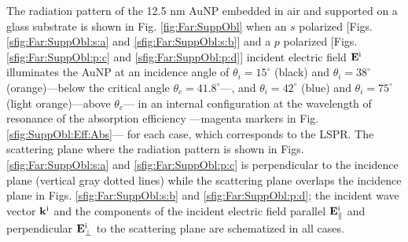 The radiation pattern of the 12.5 nm AuNP embedded in air and supported on a glass substrate is shown in Fig. \ref{fig:Far:SuppObl} when an $s$ polarized [Figs. \ref{sfig:Far:SuppObl:s:a} and \ref{sfig:Far:SuppObl:s:b}] and a  $p$ polarized [Figs. \ref{sfig:Far:SuppObl:p:c} and \ref{sfig:Far:SuppObl:p:d}] incident electric field $\vb{E}^\text{i}$ illuminates the AuNP at an incidence angle of $\theta_i = 15^\circ$ (black) and $\theta_i = 38^\circ$ (orange)---below the critical angle $\theta_c = 41.8^\circ$---, and $\theta_i = 42^\circ$ (blue) and $\theta_i = 75^\circ$ (light orange)---above  $\theta_c$--- in an internal configuration at the wavelength of resonance of the absorption efficiency ---magenta markers in Fig. \ref{sfig:SuppObl:Eff:Abs}--- for each case, which corresponds to the LSPR. The scattering plane where the radiation pattern is shown in Figs. \ref{sfig:Far:SuppObl:s:a} and \ref{sfig:Far:SuppObl:p:c}  is perpendicular to the incidence plane (vertical gray dotted lines) while the scattering plane overlaps the incidence plane in Figs. \ref{sfig:Far:SuppObl:s:b} and \ref{sfig:Far:SuppObl:p:d}; the incident wave vector $\vb{k}^\text{i}$ and the components of the incident electric field parallel $\vb{E}^\text{i}_\parallel$ and perpendicular $\vb{E}^\text{i}_\perp$ to the scattering plane are schematized in all cases.

